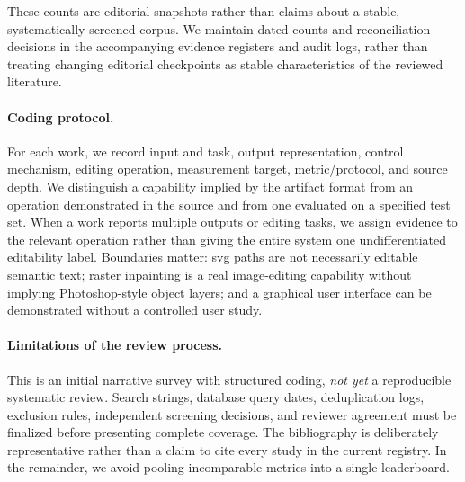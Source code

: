These counts are editorial snapshots rather than claims about a stable, systematically screened corpus.
We maintain dated counts and reconciliation decisions in the accompanying evidence registers and audit logs, rather than treating changing editorial checkpoints as stable characteristics of the reviewed literature.

\paragraph{Coding protocol.}
For each work, we record input and task, output representation, control mechanism, editing operation, measurement target, metric/protocol, and source depth.
We distinguish a capability implied by the artifact format from an operation demonstrated in the source and from one evaluated on a specified test set.
When a work reports multiple outputs or editing tasks, we assign evidence to the relevant operation rather than giving the entire system one undifferentiated editability label.
Boundaries matter: \ac{svg} paths are not necessarily editable semantic text; raster inpainting is a real image-editing capability without implying Photoshop-style object layers; and a graphical user interface can be demonstrated without a controlled user study.

\paragraph{Limitations of the review process.}
This is an initial narrative survey with structured coding, \emph{not yet} a reproducible systematic review.
Search strings, database query dates, deduplication logs, exclusion rules, independent screening decisions, and reviewer agreement must be finalized before presenting complete coverage.
The bibliography is deliberately representative rather than a claim to cite every study in the current registry.
In the remainder, we avoid pooling incomparable metrics into a single leaderboard.
